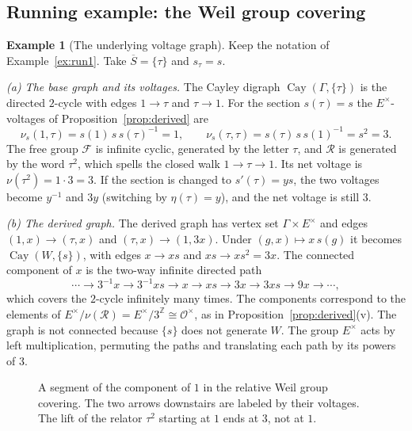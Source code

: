 \documentclass[12pt,letterpaper]{article}
\numberwithin{equation}{section}
\theoremstyle{plain}
\theoremstyle{definition}
\newtheorem{example}[theorem]{Example}
\newcommand{\Z}{\mathbb{Z}}
\newcommand{\cO}{\mathcal{O}}
\newcommand{\fr}{\mathcal{F}}             %
\newcommand{\rel}{\mathcal{R}}            %
\DeclareMathOperator{\Cay}{Cay}
\begin{document}
\subsection{Running example: the Weil group covering}

\begin{example}[The underlying voltage graph]\label{ex:run-cover}
Keep the notation of Example~\ref{ex:run1}. Take $\overline{S}=\{\tau\}$ and $s_\tau=s$.

\smallskip\noindent\emph{(a) The base graph and its voltages.} The Cayley
digraph $\Cay(\Gamma,\{\tau\})$ is the directed $2$-cycle with edges
$1\to\tau$ and $\tau\to1$. For the section $s(\tau)=s$ the
$E^\times$-voltages of Proposition~\ref{prop:derived} are
\[
\nu_s(1,\tau)=s(1)\,s\,s(\tau)^{-1}=1,\qquad
\nu_s(\tau,\tau)=s(\tau)\,s\,s(1)^{-1}=s^2=3 .
\]
The free group $\fr$ is infinite cyclic, generated by the letter $\tau$,
and $\rel$ is generated by the word $\tau^2$, which spells the closed walk
$1\to\tau\to1$. Its net voltage is $\nu(\tau^2)=1\cdot3=3$. If the section
is changed to $s'(\tau)=ys$, the two voltages become $y^{-1}$ and $3y$
(switching by $\eta(\tau)=y$), and the net voltage is still $3$.

\smallskip\noindent\emph{(b) The derived graph.} The derived graph has
vertex set $\Gamma\times E^\times$ and edges $(1,x)\to(\tau,x)$ and
$(\tau,x)\to(1,3x)$. Under $(g,x)\mapsto x\,s(g)$ it becomes
$\Cay(W,\{s\})$, with edges $x\to xs$ and $xs\to xs^2=3x$. The connected
component of $x$ is the two-way infinite directed path
\[
\cdots\to 3^{-1}x\to 3^{-1}xs\to x\to xs\to 3x\to 3xs\to 9x\to\cdots,
\]
which covers the $2$-cycle infinitely many times. The components
correspond to the elements of
$E^\times/\nu(\rel)=E^\times/3^{\Z}\cong\cO^\times$, as in
Proposition~\ref{prop:derived}(v). The graph is not connected because
$\{s\}$ does not generate $W$. The group $E^\times$ acts by left
multiplication, permuting the paths and translating each path by its
powers of $3$.

\end{example}

\begin{figure}[ht]
\centering
{}
\caption{A segment of the component of $1$ in the relative Weil group covering. The two arrows downstairs are labeled by their voltages. The lift of the relator $\tau^2$ starting at $1$ ends at $3$, not at $1$.}
\label{fig:weil-cover}
\end{figure}
\end{document}
